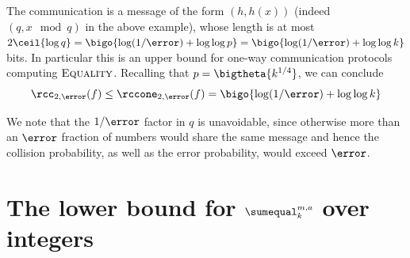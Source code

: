 The communication is a message of the form $(h,h(x))$ (indeed $(q, x\mod q)$ in the above example), whose length is at most $2\ceil{\log q}=\bigo{\log(1/\error)+\log\log p}=\bigo{\log(1/\error)+\log\log k}$ bits.
In particular this is an upper bound for one-way communication protocols computing $\textsc{Equality}$.
%
Recalling that $p=\bigtheta{k^{1/4}}$,
we can conclude
\[
\rcc_{2,\error} (f) \le\rccone_{2,\error}(f)=\bigo{\log(1/\error)+\log\log k}
\]

We note that the $1/\error$ factor in $q$ is unavoidable, since otherwise more than an $\error$ fraction of numbers would share the same message and hence the collision probability, as well as the error probability, would exceed $\error$.

%
%
\section{The lower bound for
  \texorpdfstring{$\sumequal^{m,a}_k$}{Sum-Equal-sup(m,a)sub(k)} over integers}

\label{sec:over Z}

